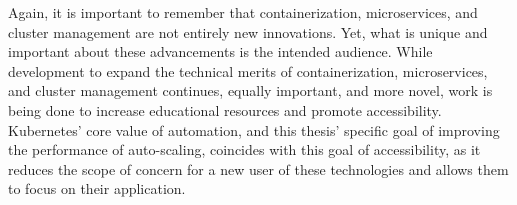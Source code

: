 Again, it is important to remember that containerization, microservices, and
cluster management are not entirely new innovations. Yet, what is unique and
important about these advancements is the intended audience. While development to expand
the technical merits of containerization, microservices, and cluster management
continues, equally important, and more novel, work is being done to increase
educational resources and promote accessibility. Kubernetes' core value of
automation, and this thesis' specific goal of improving the performance of
auto-scaling, coincides with this goal of accessibility, as it reduces the scope
of concern for a new user of these technologies and allows them to focus on
their application.
